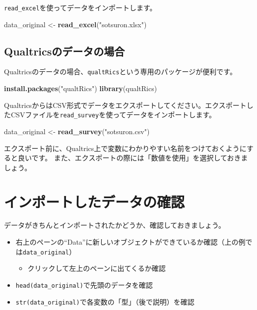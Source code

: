 \documentclass[]{book}
\newenvironment{Shaded}{\begin{snugshade}}{\end{snugshade}}
\newcommand{\KeywordTok}[1]{\textcolor[rgb]{0.13,0.29,0.53}{\textbf{#1}}}
\newcommand{\StringTok}[1]{\textcolor[rgb]{0.31,0.60,0.02}{#1}}
\newcommand{\NormalTok}[1]{#1}
\providecommand{\tightlist}{%
  \setlength{\itemsep}{0pt}\setlength{\parskip}{0pt}}
\begin{document}
\texttt{read\_excel}を使ってデータをインポートします。

\begin{Shaded}
\begin{Highlighting}[]
\NormalTok{data_original <-}\StringTok{ }\KeywordTok{read_excel}\NormalTok{(}\StringTok{"sotsuron.xlsx"}\NormalTok{)}
\end{Highlighting}
\end{Shaded}

\subsection{Qualtricsのデータの場合}\label{qualtricsux306eux30c7ux30fcux30bfux306eux5834ux5408}

Qualtricsのデータの場合、\texttt{qualtRics}という専用のパッケージが便利です。

\begin{Shaded}
\begin{Highlighting}[]
\KeywordTok{install.packages}\NormalTok{(}\StringTok{"qualtRics"}\NormalTok{)}
\KeywordTok{library}\NormalTok{(qualtRics)}
\end{Highlighting}
\end{Shaded}

QualtricsからはCSV形式でデータをエクスポートしてください。エクスポートしたCSVファイルを\texttt{read\_survey}を使ってデータをインポートします。

\begin{Shaded}
\begin{Highlighting}[]
\NormalTok{data_original <-}\StringTok{ }\KeywordTok{read_survey}\NormalTok{(}\StringTok{"sotsuron.csv"}\NormalTok{)}
\end{Highlighting}
\end{Shaded}

エクスポート前に、Qualtrics上で変数にわかりやすい名前をつけておくようにすると良いです。
また、エクスポートの際には「数値を使用」を選択しておきましょう。

\section{インポートしたデータの確認}\label{ux30a4ux30f3ux30ddux30fcux30c8ux3057ux305fux30c7ux30fcux30bfux306eux78baux8a8d}

データがきちんとインポートされたかどうか、確認しておきましょう。

\begin{itemize}
\tightlist
\item
  右上のペーンの``Data''に新しいオブジェクトができているか確認（上の例では\texttt{data\_original}）

  \begin{itemize}
  \tightlist
  \item
    クリックして左上のペーンに出てくるか確認
  \end{itemize}
\item
  \texttt{head(data\_original)}で先頭のデータを確認
\item
  \texttt{str(data\_original)}で各変数の「型」（後で説明）を確認
\end{itemize}
\end{document}
